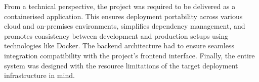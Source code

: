 From a technical perspective, the project was required to be delivered as a containerised application. This ensures deployment portability across various cloud and on-premises environments\cite{zhang2019selfhosted}, simplifies dependency management, and promotes consistency between development and production setups using technologies like Docker\cite{turnbull2018docker}. The backend architecture had to ensure seamless integration compatibility with the project's frontend interface\cite{gupta2021reactintegration}. Finally, the entire system was designed with the resource limitations of the target deployment infrastructure in mind\cite{apriorit2025constraints}.

